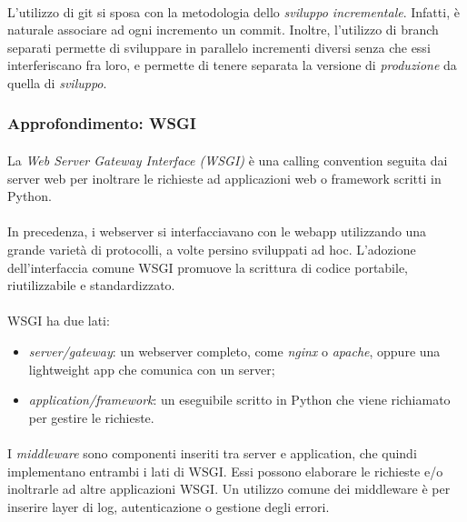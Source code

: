 \documentclass[11pt,a4paper,english]{article}
\begin{document}
\paragraph{} L'utilizzo di git si sposa con la metodologia dello \emph{sviluppo incrementale}. Infatti, è naturale associare ad ogni incremento un commit. Inoltre, l'utilizzo di branch separati permette di sviluppare in parallelo incrementi diversi senza che essi interferiscano fra loro, e permette di tenere separata la versione di \emph{produzione} da quella di \emph{sviluppo}.

\subsubsection{Approfondimento: WSGI}

\paragraph{} La \emph{Web Server Gateway Interface (WSGI)} è una calling convention seguita dai server web per inoltrare le richieste ad applicazioni web o framework scritti in Python. 

\paragraph{} In precedenza, i webserver si interfacciavano con le webapp utilizzando una grande varietà di protocolli, a volte persino sviluppati ad hoc. L'adozione dell'interfaccia comune WSGI promuove la scrittura di codice portabile, riutilizzabile e standardizzato.

\paragraph{} WSGI ha due lati:
\begin{itemize}
    \item \emph{server/gateway}: un webserver completo, come \emph{nginx} o \emph{apache}, oppure una lightweight app che comunica con un server;
    \item \emph{application/framework}: un eseguibile scritto in Python che viene richiamato per gestire le richieste.
\end{itemize}

\paragraph{} I \emph{middleware} sono componenti inseriti tra server e application, che quindi implementano entrambi i lati di WSGI. Essi possono elaborare le richieste e/o inoltrarle ad altre applicazioni WSGI. Un utilizzo comune dei middleware è per inserire layer di log, autenticazione o gestione degli errori. 
\end{document}
